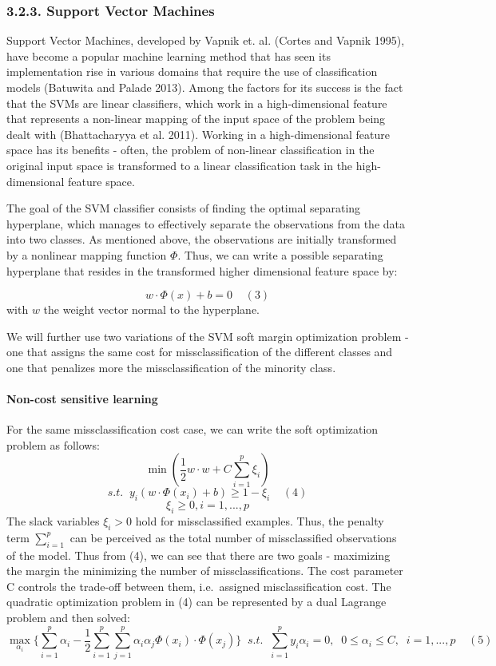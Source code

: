 \documentclass[12pt,]{article}
\let\oldparagraph\paragraph
\renewcommand{\paragraph}[1]{\oldparagraph{#1}\mbox{}}
\begin{document}
\hypertarget{support-vector-machines}{%
\subsubsection{3.2.3. Support Vector
Machines}\label{support-vector-machines}}

Support Vector Machines, developed by Vapnik et. al. (Cortes and Vapnik
1995), have become a popular machine learning method that has seen its
implementation rise in various domains that require the use of
classification models (Batuwita and Palade 2013). Among the factors for
its success is the fact that the SVMs are linear classifiers, which work
in a high-dimensional feature that represents a non-linear mapping of
the input space of the problem being dealt with (Bhattacharyya et al.
2011). Working in a high-dimensional feature space has its benefits -
often, the problem of non-linear classification in the original input
space is transformed to a linear classification task in the
high-dimensional feature space.

The goal of the SVM classifier consists of finding the optimal
separating hyperplane, which manages to effectively separate the
observations from the data into two classes. As mentioned above, the
observations are initially transformed by a nonlinear mapping function
\(\Phi\). Thus, we can write a possible separating hyperplane that
resides in the transformed higher dimensional feature space by:

\[w\cdot\Phi(x)+b=0\;\;\;\;(3)\] with \(w\) the weight vector normal to
the hyperplane.

We will further use two variations of the SVM soft margin optimization
problem - one that assigns the same cost for missclassification of the
different classes and one that penalizes more the missclassification of
the minority class.

\hypertarget{non-cost-sensitive-learning}{%
\paragraph{Non-cost sensitive
learning}\label{non-cost-sensitive-learning}}

For the same missclassification cost case, we can write the soft
optimization problem as follows:
\[\min(\frac{1}{2}w \cdot w + C\sum_{i=1}^{p} \xi_i) \]
\[s.t. \;\; y_i(w \cdot \Phi(x_i) + b) \geq 1 - \xi_i\;\;\;\;(4) \]
\[\xi_i \geq 0, i = 1,...,p\] The slack variables \(\xi_i > 0\) hold for
missclassified examples. Thus, the penalty term \(\sum_{i=1}^{p}\) can
be perceived as the total number of missclassified observations of the
model. Thus from (4), we can see that there are two goals - maximizing
the margin the minimizing the number of missclassifications. The cost
parameter C controls the trade-off between them, i.e.~assigned
misclassification cost. The quadratic optimization problem in (4) can be
represented by a dual Lagrange problem and then solved:
\[\max_{\alpha_i} \{ \sum_{i=1}^{p}{\alpha_i} - \frac{1}{2} \sum_{i=1}^{p}\sum_{j=1}^{p}{\alpha_i\alpha_j\Phi(x_i)\cdot\Phi(x_j)} \} \;\; s.t. \;\; \sum_{i=1}^{p}{y_i\alpha_i}=0, \;\; 0 \leq\alpha_i\leq C, \;\; i=1,...,p\;\;\;\;(5) \]
\end{document}
